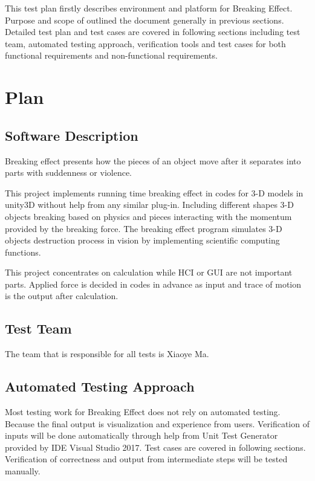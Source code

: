 \documentclass[12pt, titlepage]{article}
\begin{document}
	This test plan firstly describes environment and platform for Breaking Effect. Purpose and scope of outlined the document generally in previous sections. Detailed test plan and test cases are covered in following sections including test team, automated testing approach, verification tools and test cases for both functional requirements and non-functional requirements.
	
	\section{Plan}
	
	\subsection{Software Description}
	
	Breaking effect presents how the pieces of an object move after it separates into parts with
	suddenness or violence.
	
	This project implements running time breaking effect in codes for 3-D models in unity3D without help from any similar plug-in. Including different shapes 3-D objects breaking based on physics and pieces interacting with the momentum provided by the breaking force. The breaking effect program simulates 3-D objects destruction process in vision by implementing scientific computing functions.
	
	
	This project concentrates on calculation while
	HCI or GUI are not important parts. Applied force is decided in codes in advance as input
	and trace of motion is the output after calculation.
	
	\subsection{Test Team}
	The team that is responsible for all tests is Xiaoye Ma.
	\subsection{Automated Testing Approach}
	
	Most testing work for Breaking Effect does not rely on automated testing. Because the final output is visualization and experience from users. Verification of inputs will be done automatically through help from Unit Test Generator provided by IDE Visual Studio 2017. Test cases are covered in following sections. Verification of correctness and output from intermediate steps will be tested manually.  
	
\end{document}
